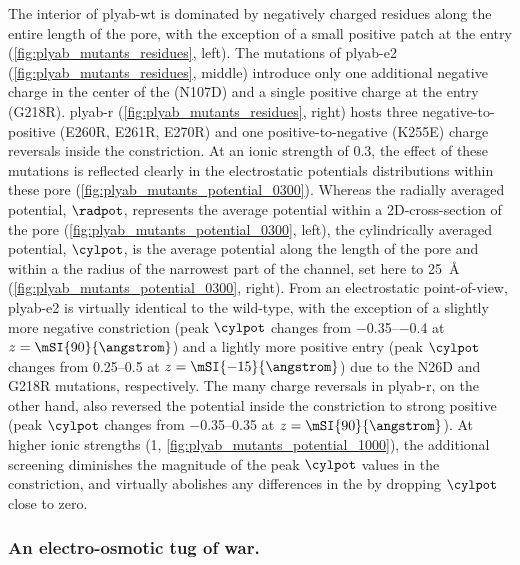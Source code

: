 The interior of \gls{plyab-wt} is dominated by negatively charged residues along the entire length of the
pore, with the exception of a small positive patch at the \transi{} entry (\cref{fig:plyab_mutants_residues},
left). The mutations of \gls{plyab-e2} (\cref{fig:plyab_mutants_residues}, middle) introduce only one
additional negative charge in the center of the \transi{} \lumen{} (N107D) and a single positive charge at the
\transi{} entry (G218R). \Gls{plyab-r} (\cref{fig:plyab_mutants_residues}, right) hosts three
negative-to-positive (E260R, E261R, E270R) and one positive-to-negative (K255E) charge reversals inside the
\cisi{} constriction. At an ionic strength of \SI{0.3}{\Molar}, the effect of these mutations is reflected
clearly in the electrostatic potentials distributions within these pore
(\cref{fig:plyab_mutants_potential_0300}). Whereas the radially averaged potential, $\radpot$, represents the
average potential within a 2D-cross-section of the pore (\cref{fig:plyab_mutants_potential_0300}, left), the
cylindrically averaged potential, $\cylpot$, is the average potential along the length of the pore and within
a the radius of the narrowest part of the channel, set here to \SI{25}{\angstrom}
(\cref{fig:plyab_mutants_potential_0300}, right). From an electrostatic point-of-view, \gls{plyab-e2} is
virtually identical to the wild-type, with the exception of a slightly more negative constriction (peak
$\cylpot$ changes from \SIrange{-0.35}{-0.4}{\kTe} at $z = \mSI{90}{\angstrom}$) and a lightly more positive
\transi{} entry (peak $\cylpot$ changes from \SIrange{+0.25}{+0.5}{\kTe} at $z = \mSI{-15}{\angstrom}$) due to
the N26D and G218R mutations, respectively. The many charge reversals in \gls{plyab-r}, on the other hand,
also reversed the potential inside the constriction to strong positive (peak $\cylpot$ changes from
\SIrange{-0.35}{+0.35}{\kTe} at $z = \mSI{90}{\angstrom}$). At higher ionic strengths (\SI{1}{\Molar},
\cref{fig:plyab_mutants_potential_1000}), the additional screening diminishes the magnitude of the peak
$\cylpot$ values in the constriction, and virtually abolishes any differences in the \transi{} \lumen{} by
dropping $\cylpot$ close to zero.

\subsubsection{An electro-osmotic tug of war.}
%

